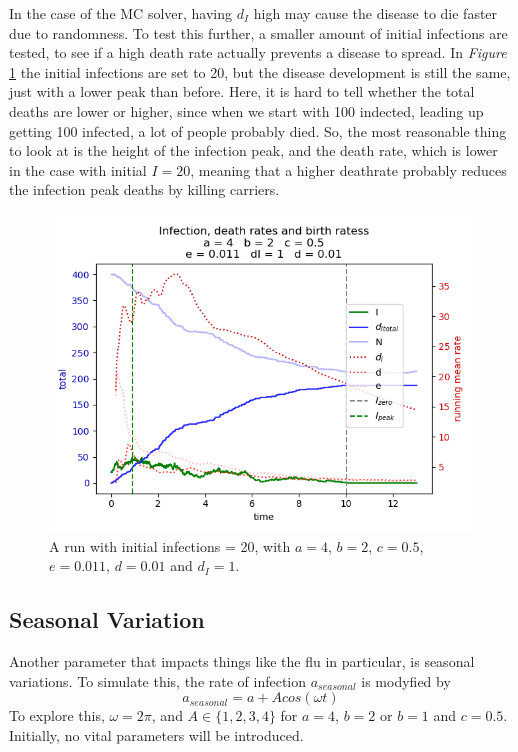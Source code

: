 In the case of the MC solver, having $d_I$ high may cause the disease to die faster due to randomness. To test this further, a smaller amount of initial infections are tested, to see if a high death rate actually prevents a disease to spread.
In \textit{Figure} \ref{fig:vitalI20} the initial infections are set to 20, but the disease development is still the same, just with a lower peak than before. 
Here, it is hard to tell whether the total deaths are lower or higher, since when we start with 100 indected, leading up getting 100 infected, a lot of people probably died.
So, the most reasonable thing to look at is the height of the infection peak, and the death rate, which is lower in the case with initial $I=20$, meaning that a higher deathrate probably reduces the infection peak deaths by killing carriers.
\begin{figure}[H]
    \centering
    \includegraphics[scale=0.55]{plots/MC_solver_vitalI20_a_4_b_2_c_0.5_IdI1.png}
    \caption{A run with initial infections = 20, with $a=4$, $b=2$, $c=0.5$, $e=0.011$, $d=0.01$ and $d_I=1$.}
    \label{fig:vitalI20}
\end{figure}


\subsection{Seasonal Variation}
Another parameter that impacts things like the flu in particular, is seasonal variations.
To simulate this, the rate of infection $a_{seasonal}$ is modyfied by
$$
a_{seasonal}=a+Acos(\omega t)
$$
To explore this, $\omega = 2 \pi$, and $A \in \{1,2,3,4\}$ for $a=4$, $b=2$ or $b=1$ and $c=0.5$. Initially, no vital parameters will be introduced.

